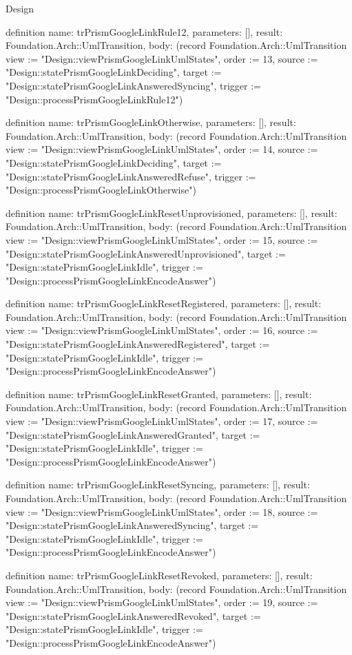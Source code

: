 \begin{lexlean}{Design}
\begin{semanticmodule}
definition{
  name: trPrismGoogleLinkRule12,
  parameters: [],
  result: Foundation.Arch::UmlTransition,
  body: (record Foundation.Arch::UmlTransition {view := "Design::viewPrismGoogleLinkUmlStates", order := 13, source := "Design::statePrismGoogleLinkDeciding", target := "Design::statePrismGoogleLinkAnsweredSyncing", trigger := "Design::processPrismGoogleLinkRule12"})
}

definition{
  name: trPrismGoogleLinkOtherwise,
  parameters: [],
  result: Foundation.Arch::UmlTransition,
  body: (record Foundation.Arch::UmlTransition {view := "Design::viewPrismGoogleLinkUmlStates", order := 14, source := "Design::statePrismGoogleLinkDeciding", target := "Design::statePrismGoogleLinkAnsweredRefuse", trigger := "Design::processPrismGoogleLinkOtherwise"})
}

definition{
  name: trPrismGoogleLinkResetUnprovisioned,
  parameters: [],
  result: Foundation.Arch::UmlTransition,
  body: (record Foundation.Arch::UmlTransition {view := "Design::viewPrismGoogleLinkUmlStates", order := 15, source := "Design::statePrismGoogleLinkAnsweredUnprovisioned", target := "Design::statePrismGoogleLinkIdle", trigger := "Design::processPrismGoogleLinkEncodeAnswer"})
}

definition{
  name: trPrismGoogleLinkResetRegistered,
  parameters: [],
  result: Foundation.Arch::UmlTransition,
  body: (record Foundation.Arch::UmlTransition {view := "Design::viewPrismGoogleLinkUmlStates", order := 16, source := "Design::statePrismGoogleLinkAnsweredRegistered", target := "Design::statePrismGoogleLinkIdle", trigger := "Design::processPrismGoogleLinkEncodeAnswer"})
}

definition{
  name: trPrismGoogleLinkResetGranted,
  parameters: [],
  result: Foundation.Arch::UmlTransition,
  body: (record Foundation.Arch::UmlTransition {view := "Design::viewPrismGoogleLinkUmlStates", order := 17, source := "Design::statePrismGoogleLinkAnsweredGranted", target := "Design::statePrismGoogleLinkIdle", trigger := "Design::processPrismGoogleLinkEncodeAnswer"})
}

definition{
  name: trPrismGoogleLinkResetSyncing,
  parameters: [],
  result: Foundation.Arch::UmlTransition,
  body: (record Foundation.Arch::UmlTransition {view := "Design::viewPrismGoogleLinkUmlStates", order := 18, source := "Design::statePrismGoogleLinkAnsweredSyncing", target := "Design::statePrismGoogleLinkIdle", trigger := "Design::processPrismGoogleLinkEncodeAnswer"})
}

definition{
  name: trPrismGoogleLinkResetRevoked,
  parameters: [],
  result: Foundation.Arch::UmlTransition,
  body: (record Foundation.Arch::UmlTransition {view := "Design::viewPrismGoogleLinkUmlStates", order := 19, source := "Design::statePrismGoogleLinkAnsweredRevoked", target := "Design::statePrismGoogleLinkIdle", trigger := "Design::processPrismGoogleLinkEncodeAnswer"})
}


\end{semanticmodule}
\end{lexlean}
